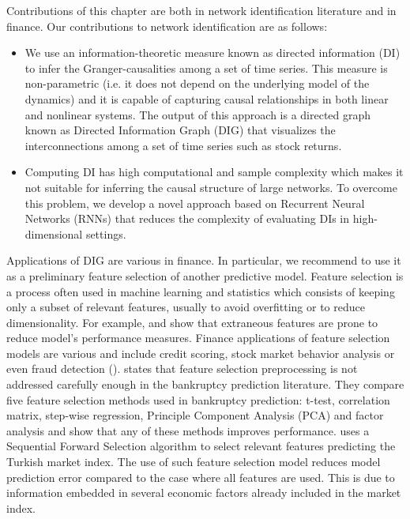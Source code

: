 \clearpage
Contributions of this chapter are both in network identification literature and in finance.
Our contributions to network identification are as follows:
\begin{itemize}
    \item We use an information-theoretic measure known as directed information (DI) to infer the Granger-causalities among a set of time series. 
This measure is non-parametric (i.e. it does not depend on the underlying model of the dynamics) and it is capable of capturing causal relationships in both linear and nonlinear systems. The output of this approach is a directed graph known as Directed Information Graph (DIG) that visualizes the interconnections among a set of time series such as stock returns. 

\item Computing DI has high computational and sample complexity which makes it not suitable for inferring the causal structure of large networks. 
To overcome this problem, we develop a novel approach based on Recurrent Neural Networks (RNNs) that reduces the complexity of evaluating DIs in high-dimensional settings. 
\end{itemize}



Applications of DIG are various in finance. 
In particular, we recommend to use it as a preliminary feature selection of another predictive model. Feature selection is a process often used in machine learning and statistics which consists of keeping only a subset of relevant features, usually to avoid overfitting or to reduce dimensionality. 
For example, \citet{fs1} and \citet{fs2} show that extraneous features are prone to reduce model's performance measures. 
Finance applications of feature selection models are various and include credit scoring, stock market behavior analysis  or even fraud detection (\citet{fs_fraud}).
\citet{tsai2009} states that feature selection preprocessing is not addressed carefully enough in the bankruptcy prediction literature. They compare five feature selection methods used in bankruptcy prediction: t-test, correlation matrix, step-wise regression, Principle Component Analysis (PCA) and factor analysis and show that any of these methods improves performance. 
\citet{fs_stock} uses a Sequential Forward Selection algorithm to select relevant features predicting the Turkish market index. The use of such feature selection model reduces model prediction error compared to the case where all features are used. This is due to information embedded in several economic factors already included in the market index. 

